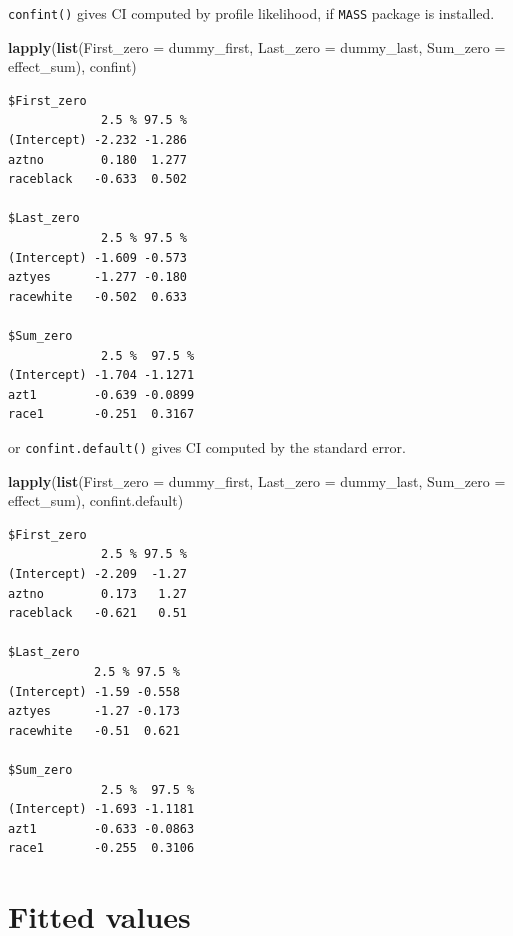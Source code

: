 \documentclass[]{book}
\newenvironment{Shaded}{\begin{snugshade}}{\end{snugshade}}
\newcommand{\DataTypeTok}[1]{\textcolor[rgb]{0.13,0.29,0.53}{#1}}
\newcommand{\KeywordTok}[1]{\textcolor[rgb]{0.13,0.29,0.53}{\textbf{#1}}}
\newcommand{\NormalTok}[1]{#1}
\begin{document}
\texttt{confint()} gives CI computed by profile likelihood, if \texttt{MASS} package is installed.

\begin{Shaded}
\begin{Highlighting}[]
\KeywordTok{lapply}\NormalTok{(}\KeywordTok{list}\NormalTok{(}\DataTypeTok{First_zero =}\NormalTok{ dummy_first, }\DataTypeTok{Last_zero =}\NormalTok{ dummy_last, }\DataTypeTok{Sum_zero =}\NormalTok{ effect_sum), confint)}
\end{Highlighting}
\end{Shaded}

\begin{verbatim}
$First_zero
             2.5 % 97.5 %
(Intercept) -2.232 -1.286
aztno        0.180  1.277
raceblack   -0.633  0.502

$Last_zero
             2.5 % 97.5 %
(Intercept) -1.609 -0.573
aztyes      -1.277 -0.180
racewhite   -0.502  0.633

$Sum_zero
             2.5 %  97.5 %
(Intercept) -1.704 -1.1271
azt1        -0.639 -0.0899
race1       -0.251  0.3167
\end{verbatim}

or \texttt{confint.default()} gives CI computed by the standard error.

\begin{Shaded}
\begin{Highlighting}[]
\KeywordTok{lapply}\NormalTok{(}\KeywordTok{list}\NormalTok{(}\DataTypeTok{First_zero =}\NormalTok{ dummy_first, }\DataTypeTok{Last_zero =}\NormalTok{ dummy_last, }\DataTypeTok{Sum_zero =}\NormalTok{ effect_sum), confint.default)}
\end{Highlighting}
\end{Shaded}

\begin{verbatim}
$First_zero
             2.5 % 97.5 %
(Intercept) -2.209  -1.27
aztno        0.173   1.27
raceblack   -0.621   0.51

$Last_zero
            2.5 % 97.5 %
(Intercept) -1.59 -0.558
aztyes      -1.27 -0.173
racewhite   -0.51  0.621

$Sum_zero
             2.5 %  97.5 %
(Intercept) -1.693 -1.1181
azt1        -0.633 -0.0863
race1       -0.255  0.3106
\end{verbatim}

\hypertarget{fitted-values}{%
\section{Fitted values}\label{fitted-values}}
\end{document}
